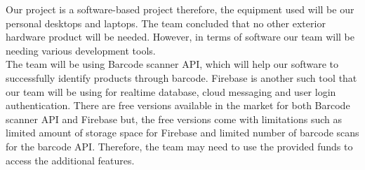 Our project is a software-based project therefore, the equipment used will be our personal desktops and laptops. 
The team concluded that no other exterior hardware product will be needed. However, in terms of software our team 
will be needing various development tools. 
\\
The team will be using Barcode scanner API, which will help our software to successfully identify products
 through barcode. Firebase is another such tool that our team will be using for realtime database, cloud 
 messaging and user login authentication. There are free versions available in the market for both Barcode 
 scanner API and Firebase but, the free versions come with limitations such as limited amount of storage space
  for Firebase and limited number of barcode scans for the barcode API. Therefore, the team may need to use the 
  provided funds to access the additional features.
